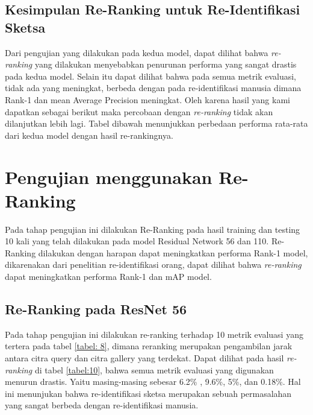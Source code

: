 \pagebreak

\subsection{Kesimpulan Re-Ranking untuk Re-Identifikasi Sketsa}
Dari pengujian yang dilakukan pada kedua model, dapat dilihat bahwa \textit{re-ranking} yang dilakukan menyebabkan penurunan performa yang sangat drastis pada kedua model. Selain itu dapat dilihat bahwa pada semua metrik evaluasi, tidak ada yang meningkat, berbeda dengan pada re-identifikasi manusia dimana Rank-1 dan mean Average Precision meningkat. Oleh karena hasil yang kami dapatkan sebagai berikut maka percobaan dengan \textit{re-ranking} tidak akan dilanjutkan lebih lagi. Tabel dibawah menunjukkan perbedaan performa rata-rata dari kedua model dengan hasil re-rankingnya.

\section{Pengujian menggunakan Re-Ranking}
\vspace{2ex}
Pada tahap pengujian ini dilakukan Re-Ranking pada hasil training dan testing 10 kali yang telah dilakukan pada model Residual Network 56 dan 110. Re-Ranking dilakukan dengan harapan dapat meningkatkan performa Rank-1 model, dikarenakan dari penelitian re-identifikasi orang, dapat dilihat bahwa \textit{re-ranking} dapat meningkatkan performa Rank-1 dan mAP model.
\vspace{2ex}
\subsection{Re-Ranking pada ResNet 56}
\vspace{2ex}
Pada tahap pengujian ini dilakukan re-ranking terhadap 10 metrik evaluasi yang tertera pada tabel \ref{tabel: 8}, dimana reranking merupakan pengambilan jarak antara citra query dan citra gallery yang terdekat. Dapat dilihat pada hasil \textit{re-ranking} di tabel \ref{tabel:10}, bahwa semua metrik evaluasi yang digunakan menurun drastis. Yaitu masing-masing sebesar 6.2\% , 9.6\%, 5\%, dan 0.18\%. Hal ini menunjukan bahwa re-identifikasi sketsa merupakan sebuah permasalahan yang sangat berbeda dengan re-identifikasi manusia.

\pagebreak

